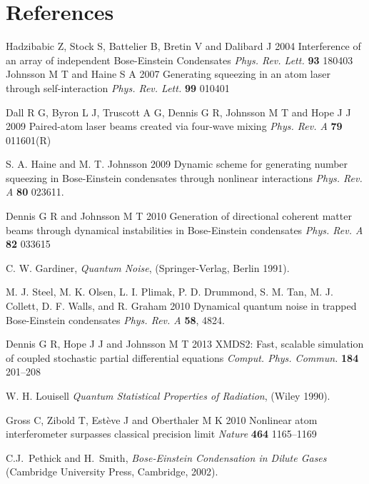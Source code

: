 \documentclass{iopart}
\begin{document}
\section*{References}
\begin{thebibliography}{10}
 Hadzibabic Z, Stock S, Battelier B, Bretin V and Dalibard J 2004 Interference of an array of independent Bose-Einstein Condensates {\it Phys. Rev. Lett.} {\bf 93} 180403
 Johnsson M T and Haine S A 2007 Generating squeezing in an atom laser through self-interaction {\it Phys. Rev. Lett.} {\bf 99} 010401

 Dall R G, Byron L J, Truscott A G, Dennis G R, Johnsson M T and Hope J J 2009 Paired-atom laser beams created via four-wave mixing {\it Phys. Rev. A} {\bf 79} 011601(R)

 S. A. Haine and M. T. Johnsson 2009 Dynamic scheme for generating number squeezing in Bose-Einstein condensates
through nonlinear interactions \emph{Phys. Rev. A} {\bf 80} 023611.

 Dennis G R and Johnsson M T 2010 Generation of directional coherent matter beams through dynamical instabilities in Bose-Einstein condensates {\it Phys. Rev. A} {\bf 82} 033615

 C. W. Gardiner, \emph{Quantum Noise}, (Springer-Verlag, Berlin 1991).

 M. J. Steel, M. K. Olsen, L. I. Plimak, P. D. Drummond, S. M. Tan, M. J. Collett, D. F. Walls, and R. Graham 2010 Dynamical quantum noise in trapped Bose-Einstein condensates {\it Phys. Rev. A} {\bf 58}, 4824.

 Dennis G R, Hope J J and Johnsson M T 2013 XMDS2: Fast, scalable simulation of coupled stochastic partial
differential equations {\it Comput. Phys. Commun.} {\bf 184} 201--208

 W. H. Louisell \emph{Quantum Statistical Properties of Radiation}, (Wiley 1990).

 Gross C, Zibold T, Est{\`{e}}ve J and Oberthaler M K 2010 Nonlinear atom interferometer surpasses classical
precision limit {\it Nature} {\bf 464} 1165--1169

 C.J.~Pethick and H.~Smith, \emph{Bose-Einstein Condensation in Dilute Gases} (Cambridge University Press, Cambridge, 2002).

\end{thebibliography}
\end{document}

